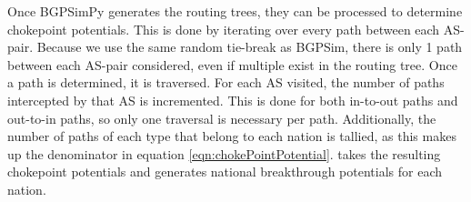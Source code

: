 \par
Once BGPSimPy generates the routing trees, they can be processed to determine chokepoint potentials. This is done by iterating over every path between each AS-pair. Because
we use the same random tie-break as BGPSim, there is only 1 path between each AS-pair considered, even if multiple exist in the routing tree. Once a path is determined, it is
traversed. For each AS visited, the number of paths intercepted by that AS is incremented. This is done for both in-to-out paths and out-to-in paths, so only one traversal is
necessary per path. Additionally, the number of paths of each type that belong to each nation is tallied, as this makes up the denominator in equation \ref{eqn:chokePointPotential}.
\toolname{} takes the resulting chokepoint potentials and generates national breakthrough potentials for each nation.